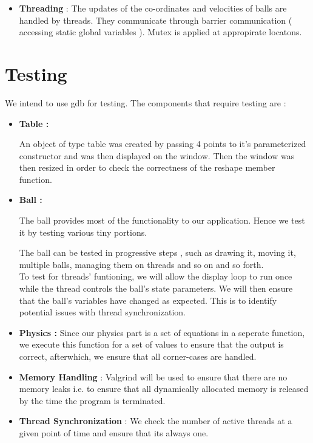 \documentclass[]{article}
\begin{document}
\begin{itemize}
\begin{flushleft}
\begin{itemize}
\item \textbf{Threading} : The updates of the co-ordinates and velocities of balls are handled by threads. They communicate through barrier communication ( accessing static global variables ). Mutex is applied at appropirate locatons.

\end{itemize}

 

\end{flushleft}

\end{itemize}

\section{Testing}

We intend to use gdb for testing. The components that require testing are :

\begin{itemize}



\item \textbf{Table :}

An object of type table was created by passing 4 points to it's parameterized constructor and was then displayed on the window. Then the window was then resized in order to check the correctness of the reshape member function.

\item \textbf{Ball :}

The ball provides most of the functionality to our application. Hence we test it by testing various tiny portions.

The ball can be tested in progressive steps , such as drawing it, moving it, multiple balls, managing them on threads and so on and so forth. \\

To test for threads' funtioning, we will allow the display loop to run once while the thread controls the ball's state parameters. We will then ensure that the ball's variables have changed as expected. This is to identify potential issues with thread synchronization.

\item \textbf{Physics :} Since our physics part is a set of equations in a seperate function, we execute this function for a set of values to ensure that the output is correct, afterwhich, we ensure that all corner-cases are handled.



\item \textbf{Memory Handling} : Valgrind will be used to ensure that there are no memory leaks i.e. to ensure that all dynamically allocated memory is released by the time the program is terminated.

\item \textbf{Thread Synchronization} : We check the number of active threads at a given point of time and ensure that its always one.


\end{itemize}
\end{document}
